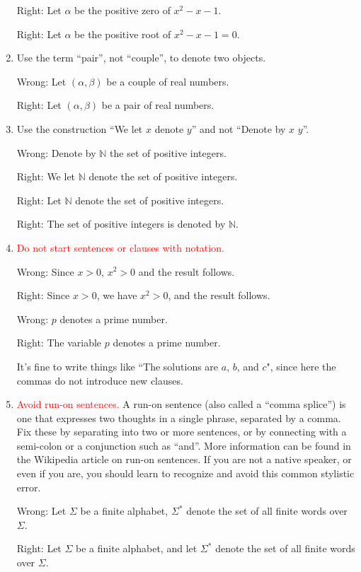 \documentclass[12pt]{article}
\begin{document}
\begin{enumerate}
Right:  Let $\alpha$ be the positive zero of $x^2 - x - 1$.

Right:  Let $\alpha$ be the positive root of $x^2 -x - 1 = 0$.

\item Use the term ``pair'', not ``couple'', to denote two objects.

Wrong:  Let $(\alpha, \beta)$ be a couple of real numbers.

Right:  Let $(\alpha, \beta)$ be a pair of real numbers.

\item Use the construction ``We let $x$ denote $y$'' and not
``Denote by $x$ $y$''.

Wrong:  Denote by $\mathbb{N}$ the set of positive integers.

Right:  We let $\mathbb{N}$ denote the set of positive integers.

Right:  Let $\mathbb{N}$ denote the set of positive integers.

Right:  The set of positive integers is denoted by $\mathbb{N}$.

\item \textcolor{red}{Do not start sentences or clauses with notation.}

Wrong:  Since $x>0$, $x^2>0$ and the result follows.

Right:  Since $x>0$, we have $x^2>0$, and the result follows.

Wrong:  $p$ denotes a prime number.

Right:  The variable $p$ denotes a prime number.

It's fine to write things like ``The solutions are $a$, $b$, and $c$",
since here the commas do not introduce new clauses.

\item \textcolor{red}{Avoid run-on sentences.}
A run-on sentence (also called a ``comma splice'') is one that
expresses two thoughts in a single phrase, separated by
a comma.  Fix these by separating
into two or more sentences, or by connecting with a semi-colon
or a conjunction such as ``and''.   More information can be found
in the Wikipedia article on run-on sentences.  If you are not a native
speaker, or even if you are, you should learn to recognize and avoid
this common stylistic error.

Wrong:  Let $\Sigma$ be a finite alphabet, $\Sigma^*$ denote the
set of all finite words over $\Sigma$.

Right:  Let $\Sigma$ be a finite alphabet, and let
$\Sigma^*$  denote the set of all finite words over $\Sigma$.


\end{enumerate}
\end{document}
